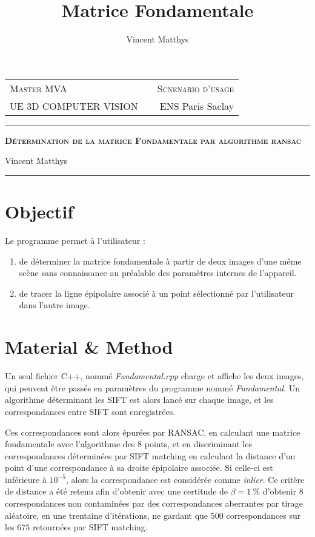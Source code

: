 \documentclass[12pt,a4paper,onecolumn]{article}
\title{Matrice Fondamentale}
\author{Vincent Matthys}
\begin{document}
\begin{tabularx}{\textwidth}{@{} l X r @{} }
	{\textsc{Master MVA}}          &  & \textsc{Scnenario d'usage} \\
	\textsc{UE 3D COMPUTER VISION} &  & {ENS Paris Saclay}         \\
\end{tabularx}
\vspace{1.5cm}
\begin{center}

	\rule[11pt]{5cm}{0.5pt}

	\textbf{\LARGE \textsc{Détermination de la matrice Fondamentale par algorithme ransac}}
	\vspace{0.5cm}

	Vincent Matthys


	\rule{5cm}{0.5pt}

	\vspace{1.5cm}
\end{center}

\section{Objectif}
Le programme permet à l'utilisateur :
\begin{enumerate}
	\item de déterminer la matrice fondamentale à partir de deux images d'une même scène sans connaissance au préalable des paramètres internes de l'appareil.
	\item de tracer la ligne épipolaire associé à un point sélectionné par l'utilisateur dans l'autre image.
\end{enumerate}


\section{Material \& Method}
Un seul fichier C++, nommé \textit{Fundamental.cpp} charge et affiche les deux images, qui peuvent être passés en paramètres du programme nommé \textit{Fundamental}. Un algorithme déterminant les SIFT est alors lancé sur chaque image, et les correspondances entre SIFT sont enregistrées.

Ces correspondances sont alors épurées par RANSAC, en calculant une matrice fondamentale avec l'algorithme des 8 points, et en discriminant les correspondances déterminées par SIFT matching en calculant la distance d'un point d'une correspondance à sa droite épipolaire associée. Si celle-ci est inférieure à \(10^{-5}\), alors la correspondance est considérée comme \textit{inlier}. Ce critère de distance a été retenu afin d'obtenir avec une certitude de \( \beta = 1~\%\) d'obtenir 8 correspondances non contaminées par des correspondances aberrantes par tirage aléatoire, en une trentaine d'itérations, ne gardant que \( 500\) correspondances sur les \( 675 \) retournées par SIFT matching.
\end{document}
